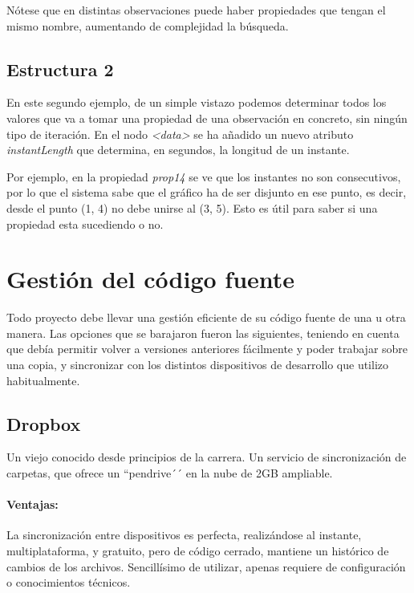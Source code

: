 N\'{o}tese que en distintas observaciones puede haber propiedades que tengan el mismo nombre, aumentando de complejidad la b\'{u}squeda.

\subsection{Estructura 2}


En este segundo ejemplo, de un simple vistazo podemos determinar todos los valores que va a tomar una propiedad de una observaci\'{o}n en concreto,
sin ning\'{u}n tipo de iteraci\'{o}n. En el nodo \emph{<data>} se ha a\~{n}adido un nuevo atributo \emph{instantLength} que determina, en segundos,
la longitud de un instante. 

Por ejemplo, en la propiedad \emph{prop14} se ve que los instantes no son consecutivos, por lo que el sistema sabe que el gr\'{a}fico ha de ser
disjunto en ese punto, es decir, desde el punto (1, 4) no debe unirse al (3, 5). Esto es \'{u}til para saber si una propiedad esta sucediendo o no.

\section{Gesti\'{o}n del c\'{o}digo fuente}
Todo proyecto debe llevar una gesti\'{o}n eficiente de su c\'{o}digo fuente de una u otra manera. Las opciones que se barajaron fueron las siguientes,
teniendo en cuenta que deb\'{i}a permitir volver a versiones anteriores f\'{a}cilmente y poder trabajar sobre una copia, y sincronizar con los
distintos dispositivos de desarrollo que utilizo habitualmente.

\subsection{Dropbox}
Un viejo conocido desde principios de la carrera. Un servicio de sincronizaci\'{o}n de carpetas, que ofrece un ``pendrive´´ en la nube de 2GB ampliable.

\paragraph{Ventajas:} La sincronizaci\'{o}n entre dispositivos es perfecta, realiz\'{a}ndose al instante, multiplataforma, y gratuito, pero de c\'{o}digo
cerrado, mantiene un hist\'{o}rico de cambios de los archivos. Sencill\'{i}simo de utilizar, apenas requiere de configuraci\'{o}n o conocimientos
t\'{e}cnicos.

